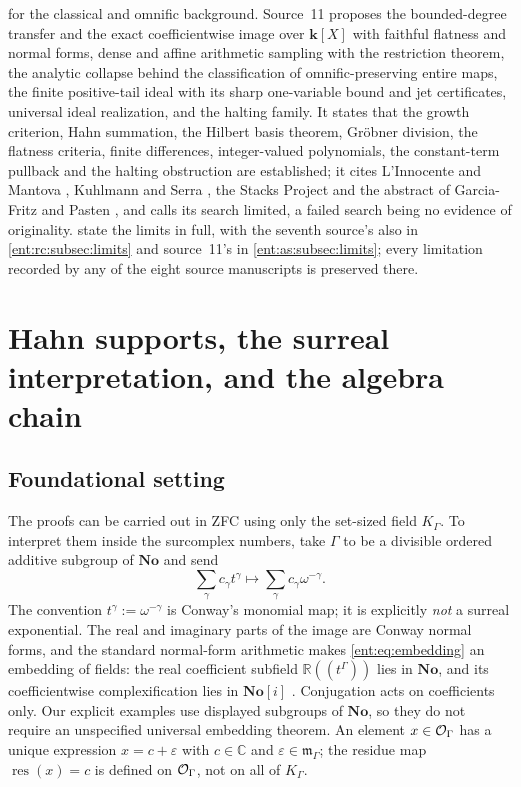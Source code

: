 \documentclass[11pt]{article}
\theoremstyle{plain}
\theoremstyle{plain}
\theoremstyle{plain}
\theoremstyle{definition}
\theoremstyle{definition}
\theoremstyle{definition}
\theoremstyle{definition}
\theoremstyle{remark}
\newcommand{\C}{\mathbb C}\newcommand{\R}{\mathbb R}
\newcommand{\No}{\mathbf{No}}
\newcommand{\K}{K_\Gamma}\newcommand{\KD}{K_\Delta}
\newcommand{\mm}{\mathfrak m_\Gamma}
\newcommand{\res}{\operatorname{res}}
\newcommand{\kk}{\mathbf k}\newcommand{\PP}{\mathbb P}
\begin{document}
\cite{LInnocenteMantova} for the classical and omnific background.
Source~11 proposes the bounded-degree transfer and the exact
coefficientwise image over $\kk[X]$ with faithful flatness and normal forms,
dense and affine arithmetic sampling with the restriction theorem, the
analytic collapse behind the classification of omnific-preserving entire
maps, the finite positive-tail ideal with its sharp one-variable bound and jet
certificates, universal ideal realization, and the halting family. It states
that the growth criterion, Hahn summation, the Hilbert basis theorem,
Gr\"obner division, the flatness criteria, finite differences, integer-valued
polynomials, the constant-term pullback and the halting obstruction are
established; it cites L'Innocente and Mantova \cite{LInnocenteMantova},
Kuhlmann and Serra \cite{KuhlmannSerra}, the Stacks Project
\cite{Stacks,StacksFlat} and the abstract of Garcia-Fritz and Pasten
\cite{GarciaFritzPasten}, and calls its search limited, a failed search being
no evidence of originality.
 state the limits in full, with the
seventh source's also in \cref{ent:rc:subsec:limits} and source~11's in
\cref{ent:as:subsec:limits}; every limitation recorded by any of the eight
source manuscripts is preserved there.

\section{Hahn supports, the surreal interpretation, and the algebra chain}
\label{ent:sec:support}

\subsection{Foundational setting}
The proofs can be carried out in ZFC using only the set-sized field $\K$. To
interpret them inside the surcomplex numbers, take $\Gamma$ to be a divisible
ordered additive subgroup of $\No$ and send
\begin{equation}\label{ent:eq:embedding}
 \sum_\gamma c_\gamma t^\gamma
 \longmapsto \sum_\gamma c_\gamma\omega^{-\gamma}.
\end{equation}
The convention $t^\gamma:=\omega^{-\gamma}$ is Conway's monomial map; it is
explicitly \emph{not} a surreal exponential. The real and imaginary parts of
the image are Conway normal forms, and the standard normal-form arithmetic
makes \eqref{ent:eq:embedding} an embedding of fields: the real coefficient
subfield $\R((t^\Gamma))$ lies in $\No$, and its coefficientwise
complexification lies in $\No[i]$ \cite{Conway,Gonshor}. Conjugation acts on
coefficients only. Our explicit examples use displayed subgroups of $\No$, so
they do not require an unspecified universal embedding theorem. An element
$x\in\mathcal O_\Gamma$ has a unique expression $x=c+\varepsilon$ with $c\in\C$ and
$\varepsilon\in\mm$; the residue map $\res(x)=c$ is defined on $\mathcal O_\Gamma$, not on
all of $\K$.
\end{document}
